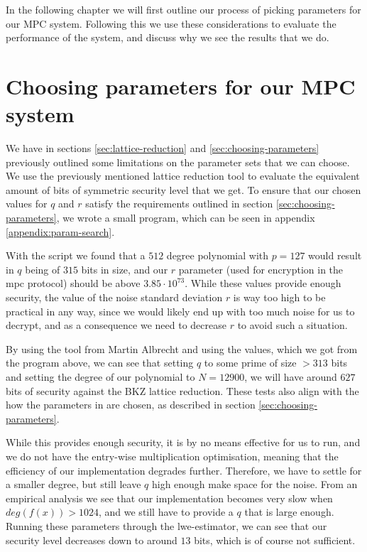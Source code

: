 \documentclass[../main.tex]{subfiles}
\begin{document}
In the following chapter we will first outline our process of picking parameters for our MPC system. Following this we use these considerations to evaluate the performance of the system, and discuss why we see the results that we do.

\section{Choosing parameters for our MPC system}
We have in sections \ref{sec:lattice-reduction} and \ref{sec:choosing-parameters} previously outlined some limitations on the parameter sets that we can choose. We use the previously mentioned lattice reduction tool to evaluate the equivalent amount of bits of symmetric security level that we get. To ensure that our chosen values for $q$ and $r$ satisfy the requirements outlined in section \ref{sec:choosing-parameters}, we wrote a small program, which can be seen in appendix \ref{appendix:param-search}.

With the script we found that a $512$ degree polynomial with $p = 127$ would result in $q$ being of $315$ bits in size, and our $r$ parameter (used for encryption in the mpc protocol) should be above $3.85 \cdot 10^{73}$.
While these values provide enough security, the value of the noise standard deviation $r$ is way too high to be
practical in any way, since we would likely end up with too much noise for us to decrypt, and as a consequence we need to decrease $r$ to avoid such a situation.

By using the tool from Martin Albrecht \cite{cryptoeprint:2015:046}
and using the values, which we got from the program above, we can see that setting $q$ to some prime
of size $> 313$ bits and setting the degree of our polynomial to $N = 12900$, we will have around $627$ bits
of security against the BKZ lattice reduction.
These tests also align with the how the parameters in \cite{damgaard2012multiparty} are chosen, as described in section \ref{sec:choosing-parameters}.

While this provides enough security, it is by no means effective for us to run, and we do not have the entry-wise multiplication optimisation, meaning that the efficiency of our implementation degrades further.
Therefore, we have to settle for a smaller degree, but still leave $q$ high enough make space for the noise.
From an empirical analysis we see that our implementation becomes very slow when $deg(f(x)) > 1024$, and we still have to provide a $q$ that is large enough.
Running these parameters through the lwe-estimator, we can see that our security level decreases
down to around $13$ bits, which is of course not sufficient.
\end{document}
